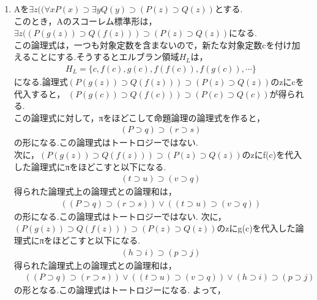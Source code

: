 \documentclass[11pt,dvipdfmx]{jreport}
\begin{document}
\begin{enumerate}
\item
Aを$\exists z ((\forall x P(x) \supset \exists y Q(y) \supset (P(z) \supset Q(z)) $とする. \\
このとき，Aのスコーレム標準形は， $ \exists z (( P(g(z)) \supset Q(f(z))) \supset (P(z) \supset Q(z))$になる.\\
この論理式は，一つも対象定数を含まないので，新たな対象定数cを付け加えることにする.そうするとエルブラン領域$H_L$は，\\
\begin{equation*}
  \begin{array}{lll}
    & H_L = \{c,f(c),g(c),f(f(c)),f(g(c)),\cdots \} & 
  \end{array}
\end{equation*}
になる.論理式$(P(g(z)) \supset Q(f(z))) \supset (P(z) \supset Q(z))$のzにcを代入すると，
$(P(g(c)) \supset Q(f(c))) \supset (P(c) \supset Q(c))$が得られる.\\
この論理式に対して，πをほどこして命題論理の論理式を作ると，
\begin{equation*}
  \begin{array}{lll}
    & (P \supset q) \supset (r \supset s) & 
  \end{array}
\end{equation*}
の形になる.この論理式はトートロジーではない.\\
次に，$(P(g(z)) \supset Q(f(z))) \supset (P(z) \supset Q(z))$のzにf(c)を代入した論理式にπをほどこすと以下になる.
\begin{equation*}
  \begin{array}{lll}
    & (t \supset u) \supset (v \supset q) & 
  \end{array}
\end{equation*}
得られた論理式上の論理式との論理和は，
\begin{equation*}
  \begin{array}{lll}
    & ((P \supset q) \supset (r \supset s)) \lor ((t \supset u) \supset (v \supset q)) & 
  \end{array}
\end{equation*}
の形になる.この論理式はトートロジーではない.
次に，$(P(g(z)) \supset Q(f(z))) \supset (P(z) \supset Q(z))$のzにg(c)を代入した論理式にπをほどこすと以下になる.
\begin{equation*}
  \begin{array}{lll}
    & (h \supset i) \supset (p \supset j) & 
  \end{array}
\end{equation*}
得られた論理式上の論理式との論理和は，
\begin{equation*}
  \begin{array}{lll}
    & ((P \supset q) \supset (r \supset s)) \lor ((t \supset u) \supset (v \supset q)) \lor (h \supset i) \supset (p \supset j)& 
  \end{array}
\end{equation*}
の形となる.この論理式はトートロジーになる.
よって，

\end{enumerate}
\end{document}
